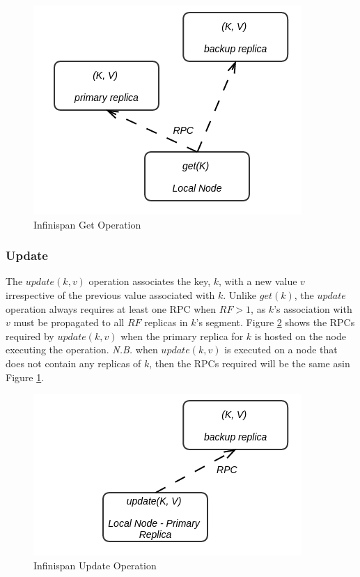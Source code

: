            \begin{figure}[htbp!] 
                \centering    
                \includegraphics[width=.6\textwidth]{infiniGet}
                \caption[Infinispan Get Operation]{Infinispan Get Operation}
                \label{fig:infiniGet}
            \end{figure}
        
        \subsubsection*{Update}
        The $update(k, v)$ operation associates the key, $k$, with a new value $v$ irrespective of the previous value associated with $k$.  Unlike $get(k)$, the $update$ operation always requires at least one RPC when $RF > 1$, as $k$'s association with $v$ must be propagated to all $RF$ replicas in $k$'s segment.  Figure \ref{fig:infiniUpdate} shows the RPCs required by $update(k,v)$ when the primary replica for $k$ is hosted on the node executing the operation.  \emph{N.B.} when $update(k,v)$ is executed on a node that does not contain any replicas of $k$, then the RPCs required will be the same asin Figure \ref{fig:infiniGet}.  
            
            \begin{figure}[htbp!] 
                \centering    
                \includegraphics[width=.6\textwidth]{infiniUpdate}
                \caption[Infinispan Update Operation]{Infinispan Update Operation}
                \label{fig:infiniUpdate}
            \end{figure}            
            
